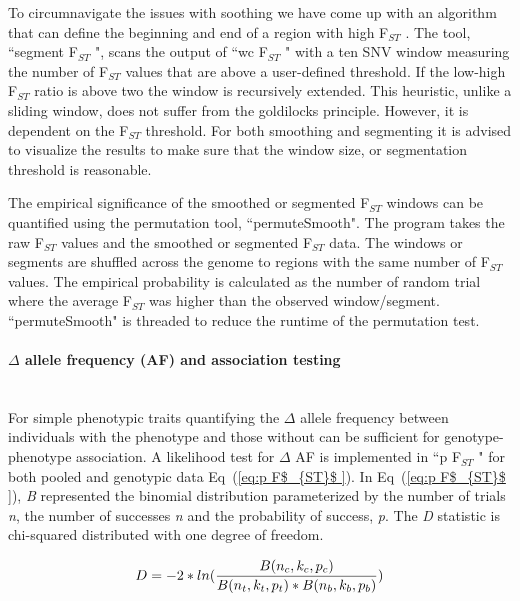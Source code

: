 \documentclass[10pt,letterpaper]{article}
\begin{document}
To circumnavigate the issues with soothing we have come up with an algorithm that can define the beginning and end of a region with high  F$_{ST}$ .  The tool, ``segment F$_{ST}$ ", scans the output of ``wc F$_{ST}$ " with a ten SNV window measuring the number of  F$_{ST}$  values that are above a user-defined threshold.  If the low-high  F$_{ST}$  ratio is above two the window is recursively extended.  This heuristic, unlike a sliding window, does not suffer from the goldilocks principle.  However, it is dependent on the  F$_{ST}$  threshold.  For both smoothing and segmenting it is advised to visualize the results to make sure that the window size, or segmentation threshold is reasonable. 

The empirical significance of the smoothed or segmented  F$_{ST}$  windows can be quantified using the permutation tool, ``permuteSmooth".  The program takes the raw  F$_{ST}$  values and the smoothed or segmented  F$_{ST}$  data.  The windows or segments are shuffled across the genome to regions with the same number of  F$_{ST}$  values.  The empirical probability is calculated as the number of random trial where the average  F$_{ST}$  was higher than the observed window/segment.  ``permuteSmooth" is threaded to reduce the runtime of the permutation test.


\paragraph*{$\Delta$ allele frequency (AF) and association testing} \mbox{} \\

For simple phenotypic traits quantifying the $\Delta$ allele frequency between individuals with the phenotype and those without can be sufficient for genotype-phenotype association.  A likelihood test for $\Delta$ AF is implemented in ``p F$_{ST}$ " for both pooled and genotypic data Eq~(\ref{eq:p F$_{ST}$ }).   In Eq~(\ref{eq:p F$_{ST}$ }), \textit{B} represented the binomial distribution parameterized by the number of trials \textit{n}, the number of successes \textit{n} and the probability of success, \textit{p}.  The \textit{D} statistic is chi-squared distributed with one degree of freedom.

\begin{equation}\label{eq:p F$_{ST}$ } 
D=-2* ln (\frac{ B(n_c,k_c,p_c) }{ B(n_t,k_t,p_t)*B(n_b,k_b,p_b)  })
\end{equation}
\end{document}
